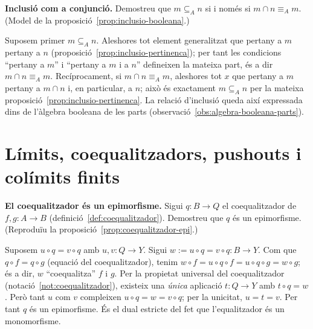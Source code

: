 \begin{exercici}
\textbf{Inclusió com a conjunció.} Demostreu que \(m\subseteq_A n\) si i només si \(m\cap n\equiv_A m\). (Model de la proposició~\ref{prop:inclusio-booleana}.)
\end{exercici}
\begin{solucio}
Suposem primer \(m\subseteq_A n\). Aleshores tot element generalitzat que pertany a \(m\) pertany a \(n\) (proposició~\ref{prop:inclusio-pertinenca}); per tant les condicions \enquote{pertany a \(m\)} i \enquote{pertany a \(m\) i a \(n\)} defineixen la mateixa part, és a dir \(m\cap n\equiv_A m\). Recíprocament, si \(m\cap n\equiv_A m\), aleshores tot \(x\) que pertany a \(m\) pertany a \(m\cap n\) i, en particular, a \(n\); això és exactament \(m\subseteq_A n\) per la mateixa proposició~\ref{prop:inclusio-pertinenca}. La relació d'inclusió queda així expressada dins de l'àlgebra booleana de les parts (observació~\ref{obs:algebra-booleana-parts}).
\end{solucio}

\section{Límits, coequalitzadors, pushouts i colímits finits}\label{prac:limits-colimits}

\begin{exercici}
\textbf{El coequalitzador és un epimorfisme.} Sigui \(q:B\to Q\) el coequalitzador de \(f,g:A\to B\) (definició~\ref{def:coequalitzador}). Demostreu que \(q\) és un epimorfisme. (Reproduïu la proposició~\ref{prop:coequalitzador-epi}.)
\end{exercici}
\begin{solucio}
Suposem \(u\circ q=v\circ q\) amb \(u,v:Q\to Y\). Sigui \(w:=u\circ q=v\circ q:B\to Y\). Com que \(q\circ f=q\circ g\) (equació del coequalitzador), tenim \(w\circ f=u\circ q\circ f=u\circ q\circ g=w\circ g\); és a dir, \(w\) \enquote{coequalitza} \(f\) i \(g\). Per la propietat universal del coequalitzador (notació~\ref{not:coequalitzador}), existeix una \emph{única} aplicació \(t:Q\to Y\) amb \(t\circ q=w\). Però tant \(u\) com \(v\) compleixen \(u\circ q=w=v\circ q\); per la unicitat, \(u=t=v\). Per tant \(q\) és un epimorfisme. És el dual estricte del fet que l'equalitzador és un monomorfisme.
\end{solucio}

